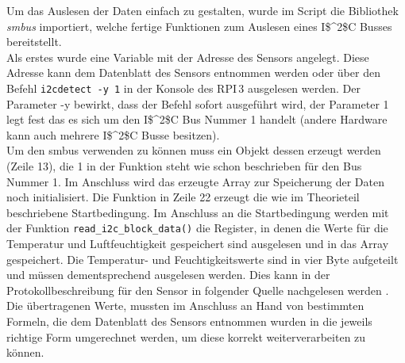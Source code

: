 

Um das Auslesen der Daten einfach zu gestalten, wurde im Script die Bibliothek \textit{smbus} importiert, welche fertige Funktionen zum Auslesen eines \ac{I$^2$C} Busses bereitstellt.\\
Als erstes wurde eine Variable mit der Adresse des Sensors angelegt. Diese Adresse kann dem Datenblatt des Sensors entnommen werden oder über den Befehl \texttt{i2cdetect -y 1} in der Konsole des \ac{RPI}\,3 ausgelesen werden. Der Parameter -y bewirkt, dass der Befehl sofort ausgeführt wird, der Parameter 1 legt fest das es sich um den \ac{I$^2$C} Bus Nummer 1 handelt (andere Hardware kann auch mehrere \ac{I$^2$C} Busse besitzen).\\
Um den smbus verwenden zu können muss ein Objekt dessen erzeugt werden (Zeile 13), die 1 in der Funktion steht wie schon beschrieben für den Bus Nummer 1. Im Anschluss wird das erzeugte Array zur Speicherung der Daten noch initialisiert. Die Funktion in Zeile 22 erzeugt die wie im Theorieteil beschriebene Startbedingung. Im Anschluss an die Startbedingung werden mit der Funktion \texttt{read\_i2c\_block\_data()} die Register, in denen die Werte für die Temperatur und Luftfeuchtigkeit gespeichert sind ausgelesen und in das Array gespeichert. Die Temperatur- und Feuchtigkeitswerte sind in vier Byte aufgeteilt und müssen dementsprechend ausgelesen werden. Dies kann in der Protokollbeschreibung für den Sensor in folgender Quelle nachgelesen werden \citep{Datenblatt_I2C_HYT221}. Die übertragenen Werte, mussten im Anschluss an Hand von bestimmten Formeln, die dem Datenblatt des Sensors entnommen wurden in die jeweils richtige Form umgerechnet werden, um diese korrekt weiterverarbeiten zu können.

